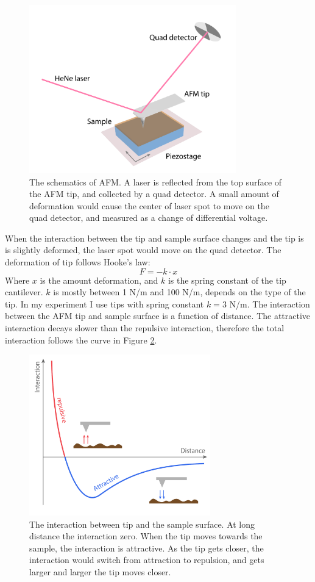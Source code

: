 \documentclass[pdflatex, sectionletters, 12pt]{pittetd}    %
\begin{document}
\begin{figure}[h!]
	\centering
	\includegraphics[width=0.8\textwidth]{Drawing/AFM.pdf}
	\caption{The schematics of AFM. A laser is reflected from the top surface of the AFM tip, and collected by a quad detector. A small amount of deformation would cause the center of laser spot to move on the quad detector, and measured as a change of differential voltage.}
	\label{FIG:AFM}
\end{figure}

When the interaction between the tip and sample surface changes and the tip is is slightly deformed, the laser spot would move on the quad detector. The deformation of tip follows Hooke's law:
$$F = -k \cdot x$$
Where $x$ is the amount deformation, and $k$ is the spring constant of the tip cantilever. $k$ is mostly between 1 N/m and 100 N/m, depends on the type of the tip. In my experiment I use tips with spring constant $k = 3$ N/m. The interaction between the AFM tip and sample surface is a function of distance. The attractive interaction decays slower than the repulsive interaction, therefore the total interaction follows the curve in Figure \ref{FIG:Interaction}.

\begin{figure}[h!]
	\centering
	\includegraphics[width=0.7\textwidth]{Drawing/Interaction.pdf}
	\caption{The interaction between tip and the sample surface. At long distance the interaction zero. When the tip moves towards the sample, the interaction is attractive. As the tip gets closer, the interaction would switch from attraction to repulsion, and gets larger and larger the tip moves closer.}
	\label{FIG:Interaction}
\end{figure}
\end{document}
